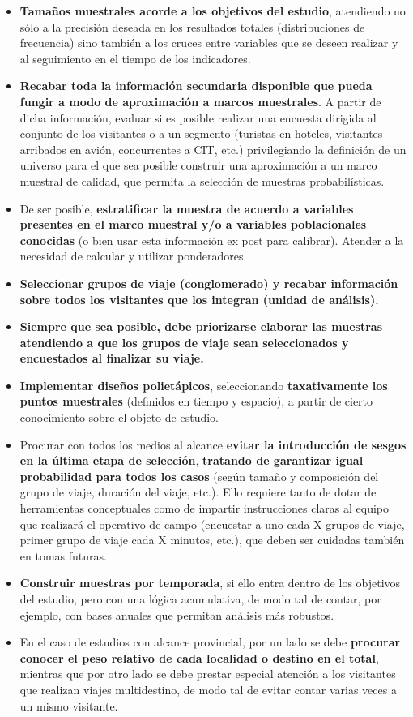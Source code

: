 \documentclass[
]{book}
\begin{document}
\begin{itemize}
\item
  \textbf{Tamaños muestrales acorde a los objetivos del estudio}, atendiendo no sólo a la precisión deseada en los resultados totales (distribuciones de frecuencia) sino también a los cruces entre variables que se deseen realizar y al seguimiento en el tiempo de los indicadores.
\item
  \textbf{Recabar toda la información secundaria disponible que pueda fungir a modo de aproximación a marcos muestrales}. A partir de dicha información, evaluar si es posible realizar una encuesta dirigida al conjunto de los visitantes o a un segmento (turistas en hoteles, visitantes arribados en avión, concurrentes a CIT, etc.) privilegiando la definición de un universo para el que sea posible construir una aproximación a un marco muestral de calidad, que permita la selección de muestras probabilísticas.
\item
  De ser posible, \textbf{estratificar la muestra de acuerdo a variables presentes en el marco muestral y/o a variables poblacionales conocidas} (o bien usar esta información ex post para calibrar). Atender a la necesidad de calcular y utilizar ponderadores.
\item
  \textbf{Seleccionar grupos de viaje (conglomerado) y recabar información sobre todos los visitantes que los integran (unidad de análisis).}
\item
  \textbf{Siempre que sea posible, debe priorizarse elaborar las muestras atendiendo a que los grupos de viaje sean seleccionados y encuestados al finalizar su viaje.}
\item
  \textbf{Implementar diseños polietápicos}, seleccionando \textbf{taxativamente los puntos muestrales} (definidos en tiempo y espacio), a partir de cierto conocimiento sobre el objeto de estudio.
\item
  Procurar con todos los medios al alcance \textbf{evitar la introducción de sesgos en la última etapa de selección}, \textbf{tratando de garantizar igual probabilidad para todos los casos} (según tamaño y composición del grupo de viaje, duración del viaje, etc.). Ello requiere tanto de dotar de herramientas conceptuales como de impartir instrucciones claras al equipo que realizará el operativo de campo (encuestar a uno cada X grupos de viaje, primer grupo de viaje cada X minutos, etc.), que deben ser cuidadas también en tomas futuras.
\item
  \textbf{Construir muestras por temporada}, si ello entra dentro de los objetivos del estudio, pero con una lógica acumulativa, de modo tal de contar, por ejemplo, con bases anuales que permitan análisis más robustos.
\item
  En el caso de estudios con alcance provincial, por un lado se debe \textbf{procurar conocer el peso relativo de cada localidad o destino en el total}, mientras que por otro lado se debe prestar especial atención a los visitantes que realizan viajes multidestino, de modo tal de evitar contar varias veces a un mismo visitante.
\end{itemize}
\end{document}
